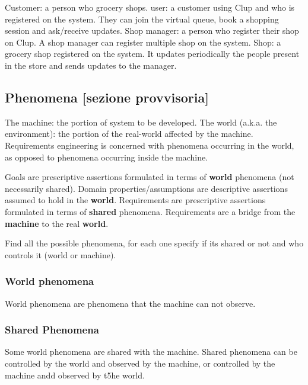 Customer: a person who grocery shops.
user: a customer using Clup and who is registered on the system. They can join the virtual queue, book a shopping session and ask/receive updates.
Shop manager: a person who register their shop on Clup. A shop manager can register multiple shop on the system.
Shop: a grocery shop registered on the system. It updates periodically the people present in the store and sends updates to the manager.

\subsection{Phenomena [sezione provvisoria]}
\label{subsect:phenomena}

The machine: the portion of system to be developed.
The world (a.k.a. the environment): the portion of the real-world affected by the machine.
Requirements engineering is concerned with phenomena occurring in the world, as opposed to phenomena occurring inside the machine.

Goals are prescriptive assertions formulated in terms of \textbf{world} phenomena (not necessarily shared).
Domain properties/assumptions are descriptive assertions assumed to hold in the \textbf{world}.
Requirements are prescriptive assertions formulated in terms of \textbf{shared} phenomena.
Requirements are a bridge from the \textbf{machine} to the real \textbf{world}.

Find all the possible phenomena, for each one specify if its shared or not and who controls it (world or machine). 

\subsubsection{World phenomena}
\label{subsubsect:worldphenomena}

World phenomena are phenomena that the machine can not observe.

\subsubsection{Shared Phenomena}
\label{subsubsect:sharedphenomena}

Some world phenomena are shared with the machine.
Shared phenomena can be controlled by the world and observed by the machine, or controlled by the machine andd observed by t5he world.
